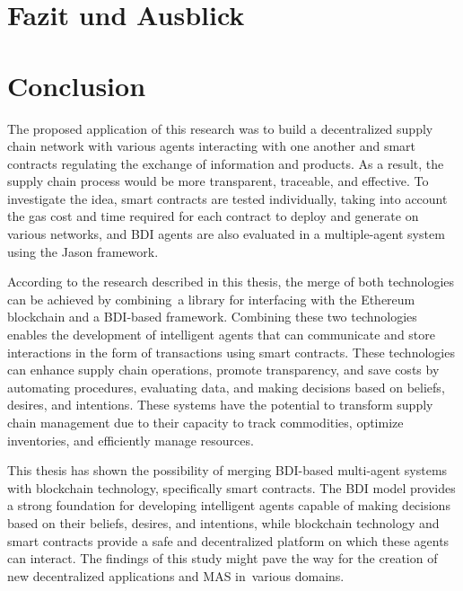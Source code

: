 {\chapter{Fazit und Ausblick}}
{\chapter{Conclusion}}

\label{sec:conclusion}

The proposed application of this research was to build a decentralized supply chain network with various agents interacting with one another and smart contracts regulating the exchange of information and products. As a result, the supply chain process would be more transparent, traceable, and effective. To investigate the idea, smart contracts are tested individually, taking into account the gas cost and time required for each contract to deploy and generate on various networks, and \ac{BDI} agents are also evaluated in a multiple-agent system using the Jason framework.

\vspace{.5cm}

According to the research described in this thesis, the merge of both technologies can be achieved by combining a library for interfacing with the Ethereum blockchain and a \ac{BDI}-based framework. Combining these two technologies enables the development of intelligent agents that can communicate and store interactions in the form of transactions using smart contracts. These technologies can enhance supply chain operations, promote transparency, and save costs by automating procedures, evaluating data, and making decisions based on beliefs, desires, and intentions. These systems have the potential to transform supply chain management due to their capacity to track commodities, optimize inventories, and efficiently manage resources.

\vspace{.5cm}

This thesis has shown the possibility of merging \ac{BDI}-based multi-agent systems with blockchain technology, specifically smart contracts. The \ac{BDI} model provides a strong foundation for developing intelligent agents capable of making decisions based on their beliefs, desires, and intentions, while blockchain technology and smart contracts provide a safe and decentralized platform on which these agents can interact. The findings of this study might pave the way for the creation of new decentralized applications and \ac{MAS} in various domains.


